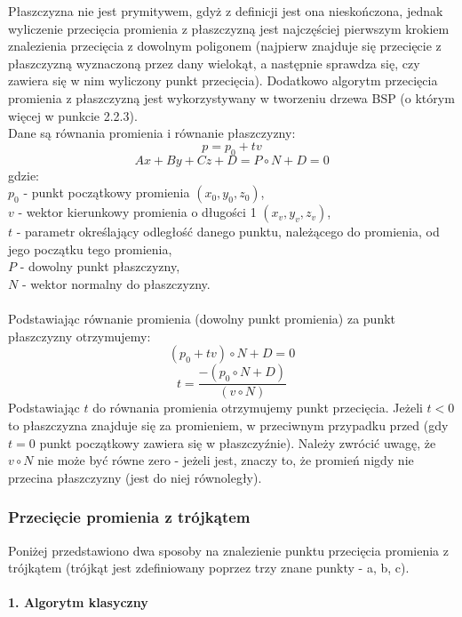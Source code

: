 Płaszczyzna nie jest prymitywem, gdyż z definicji jest ona nieskończona, jednak wyliczenie przecięcia promienia z płaszczyzną jest najczęściej pierwszym krokiem znalezienia przecięcia z dowolnym poligonem (najpierw znajduje się przecięcie z płaszczyzną wyznaczoną przez dany wielokąt, a następnie sprawdza się, czy zawiera się w nim wyliczony punkt przecięcia). Dodatkowo algorytm przecięcia promienia z płaszczyzną jest wykorzystywany w tworzeniu drzewa BSP (o którym więcej w punkcie 2.2.3). \\
\noindent
Dane są równania promienia i równanie płaszczyzny:
$$p = p_0 + tv$$
$$Ax + By + Cz + D = P \circ N + D = 0$$
gdzie:
\\
$p_0$ - punkt początkowy promienia $(x_0, y_0, z_0)$, \\
$v$ - wektor kierunkowy promienia o długości 1 $(x_v, y_v, z_v)$, \\
$t$ - parametr określający odległość danego punktu, należącego do promienia, od jego początku tego promienia, \\
$P$ - dowolny punkt płaszczyzny, \\
$N$ - wektor normalny do płaszczyzny. \\
\\
Podstawiając równanie promienia (dowolny punkt promienia) za punkt płaszczyzny otrzymujemy:
$$(p_0 + tv) \circ N + D = 0$$
$$t = \frac{-(p_0 \circ N + D)}{(v \circ N)}$$
Podstawiając $t$ do równania promienia otrzymujemy punkt przecięcia. Jeżeli $t < 0$ to płaszczyzna znajduje się za promieniem, w przeciwnym przypadku przed (gdy $t = 0$ punkt początkowy zawiera się w płaszczyźnie). Należy zwrócić uwagę, że $v \circ N$ nie może być równe zero - jeżeli jest, znaczy to, że promień nigdy nie przecina płaszczyzny (jest do niej równoległy).

\subsubsection{Przecięcie promienia z trójkątem}

Poniżej przedstawiono dwa sposoby na znalezienie punktu przecięcia promienia z trójkątem (trójkąt jest zdefiniowany poprzez trzy znane punkty - a, b, c).


\paragraph{1. Algorytm klasyczny}\mbox{} \\

